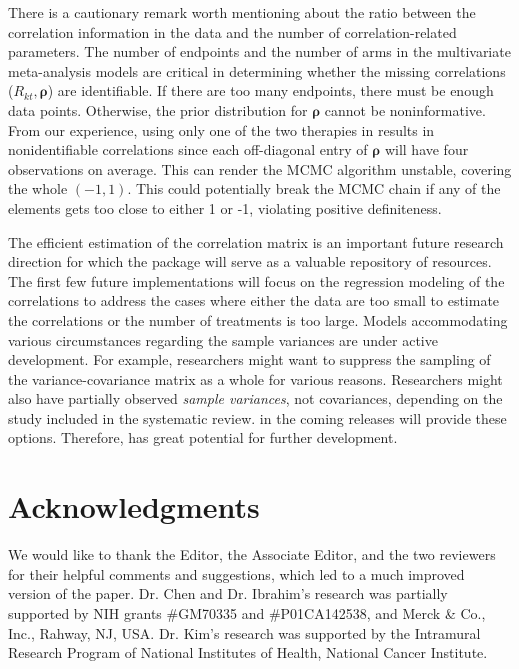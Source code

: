 There is a cautionary remark worth mentioning about the ratio between the correlation information in the data and the number of correlation-related parameters. The number of endpoints and the number of arms in the multivariate meta-analysis models are critical in determining whether the missing correlations ($R_{kt},\bm{\rho}$) are identifiable. If there are too many endpoints, there must be enough data points. Otherwise, the prior distribution for $\bm{\rho}$ cannot be noninformative. From our experience, using only one of the two therapies in  results in nonidentifiable correlations since each off-diagonal entry of $\bm{\rho}$ will have four observations on average. This can render the MCMC algorithm unstable, covering the whole $(-1,1)$. This could potentially break the MCMC chain if any of the elements gets too close to either 1 or -1, violating positive definiteness.

The efficient estimation of the correlation matrix is an important future research direction for which the package will serve as a valuable repository of resources. The first few future implementations will focus on the regression modeling of the correlations to address the cases where either the data are too small to estimate the correlations or the number of treatments is too large. Models accommodating various circumstances regarding the sample variances are under active development. For example, researchers might want to suppress the sampling of the variance-covariance matrix as a whole for various reasons. Researchers might also have partially observed \textit{sample variances}, not covariances, depending on the study included in the systematic review.  in the coming releases will provide these options. Therefore,  has great potential for further development.




\section*{Acknowledgments}
We would like to thank the Editor, the Associate Editor, and the two reviewers for their helpful comments and suggestions, which led to a much improved version of the paper. Dr. Chen and Dr. Ibrahim's research was partially supported by NIH grants \#GM70335 and  \#P01CA142538, and Merck \& Co., Inc., Rahway, NJ, USA. Dr. Kim’s research was supported by the Intramural Research Program of National Institutes of Health, National Cancer Institute.

